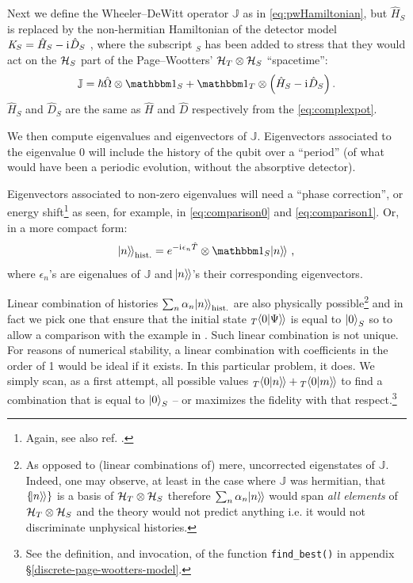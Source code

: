 Next we define the Wheeler--DeWitt operator $\mathbb{J}$ as in
\eqref{eq:pwHamiltonian}, but $\hat{H}_S$ is replaced by the non-hermitian
Hamiltonian of the detector model
$\mathit{K}_S = \hat{H}_S - \mathrm{i}\mkern1mu \hat{D}_S$
\parencite{RuschhauptAbsorption},
where the subscript $_S$ has been added to stress
that they would act on the $\mathcal{H}_S$ part
of the Page--Wootters' $\mathcal{H}_T \otimes \mathcal{H}_S$ ``spacetime'':
\begin{equation}
  \mathbb{J} = \hbar\hat{\Omega}\ox\idop_S + \idop_T\ox\qty(\hat{H}_S -\iu \hat{D}_S) \,\text{.}
\end{equation}
$\hat{H}_S$ and $\hat{D}_S$ are the same as $\hat{H}$ and $\hat{D}$
respectively from the \eqref{eq:complexpot}.

We then compute eigenvalues and eigenvectors of $\mathbb{J}$.
Eigenvectors associated to the eigenvalue $0$ will include
the history of the qubit over a ``period''
(of what would have been a periodic evolution, without the absorptive detector).

Eigenvectors associated to non-zero eigenvalues will need a ``phase correction'',
or energy shift\footnote{ Again, see also ref. \cite[\S ``The Zero-eigenvalue'']{Lloyd:Time}. }
as seen, for example, in \eqref{eq:comparison0} and \eqref{eq:comparison1}.
Or, in a more compact form:
\begin{equation}
  \dket{n}_{\text{hist.}} = e^{-\iu \epsilon_n \hat{T}} \ox \idop_S \dket{n}
  \,\text{,}
\end{equation}
where $\epsilon_n$'s are eigenalues of $\mathbb{J}$ and
$\hspace{-0.300em}\left.\left| n \right\rangle\hspace{-0.115em}\right\rangle$'s their corresponding eigenvectors.

Linear combination of histories $\sum_n \alpha_n \hspace{-0.300em}\left.\left| n \right\rangle\hspace{-0.115em}\right\rangle_{\text{hist.}}$
are also physically possible\footnote{
  As opposed to (linear combinations of) mere, uncorrected eigenstates of $\mathbb{J}$.
  Indeed, one may observe,
  at least in the case where $\mathbb{J}$ was hermitian,
  that $\left\{\hspace{-0.300em}\left.\left| n \right\rangle\hspace{-0.115em}\right\rangle\right\}$ is a basis
  of $\mathcal{H}_T \otimes \mathcal{H}_S$ therefore
  $\sum_n \alpha_n \hspace{-0.300em}\left.\left| n \right\rangle\hspace{-0.115em}\right\rangle$ would span \emph{all elements}
  of $\mathcal{H}_T \otimes \mathcal{H}_S$ and the theory would not predict anything i.e.
  it would not discriminate unphysical histories.
}
and in fact we pick
one that ensure that the initial state ${}_{T}\hspace{-0.300em}\left.\left\langle 0 \middle| \Psi \right\rangle\hspace{-0.115em}\right\rangle$ is equal to $\ket{0}_S$
so to allow a comparison with the example in \cite{RuschhauptAbsorption}.
Such linear combination is not unique. For reasons of numerical stability,
a linear combination with coefficients in the order of 1 would be ideal if it exists.
In this particular problem, it does.
We simply scan, as a first attempt, all possible values ${}_{T}\hspace{-0.300em}\left.\left\langle 0 \middle| n \right\rangle\hspace{-0.115em}\right\rangle + {}_{T}\hspace{-0.300em}\left.\left\langle 0 \middle| m \right\rangle\hspace{-0.115em}\right\rangle$
to find a combination that is equal to $\ket{0}_S$
-- or maximizes the fidelity with that respect.\footnote{
  See the definition, and invocation, of the function \texttt{find_best()} in appendix \S \ref{discrete-page-wootters-model}.
}


